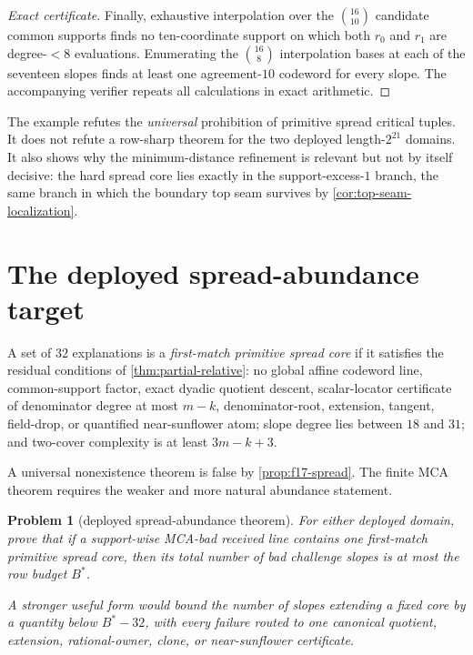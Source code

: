 \documentclass[11pt,a4paper]{amsart}
\numberwithin{equation}{section}
\newtheorem{problem}[theorem]{Problem}
\theoremstyle{remark}
\begin{document}
\begin{proof}[Exact certificate]
Finally, exhaustive interpolation over the $\binom{16}{10}$ candidate common supports finds no ten-coordinate support on which both $r_0$ and $r_1$ are degree-$<8$ evaluations.  Enumerating the $\binom{16}{8}$ interpolation bases at each of the seventeen slopes finds at least one agreement-$10$ codeword for every slope.  The accompanying verifier repeats all calculations in exact arithmetic.
\end{proof}

\begin{remark}\label{rem:counter-scope}
The example refutes the \emph{universal} prohibition of primitive spread critical tuples.  It does not refute a row-sharp theorem for the two deployed length-$2^{21}$ domains.  It also shows why the minimum-distance refinement is relevant but not by itself decisive: the hard spread core lies exactly in the support-excess-$1$ branch, the same branch in which the boundary top seam survives by \cref{cor:top-seam-localization}.
\end{remark}

\section{The deployed spread-abundance target}

\begin{definition}\label{def:spread-core}
A set of $32$ explanations is a \emph{first-match primitive spread core} if it satisfies the residual conditions of \cref{thm:partial-relative}: no global affine codeword line, common-support factor, exact dyadic quotient descent, scalar-locator certificate of denominator degree at most $m-k$, denominator-root, extension, tangent, field-drop, or quantified near-sunflower atom; slope degree lies between $18$ and $31$; and two-cover complexity is at least $3m-k+3$.
\end{definition}

A universal nonexistence theorem is false by \cref{prop:f17-spread}.  The finite MCA theorem requires the weaker and more natural abundance statement.

\begin{problem}[deployed spread-abundance theorem]\label{prob:spread-abundance}
For either deployed domain, prove that if a support-wise MCA-bad received line contains one first-match primitive spread core, then its total number of bad challenge slopes is at most the row budget $B^*$.

A stronger useful form would bound the number of slopes extending a fixed core by a quantity below $B^*-32$, with every failure routed to one canonical quotient, extension, rational-owner, clone, or near-sunflower certificate.
\end{problem}
\end{document}
